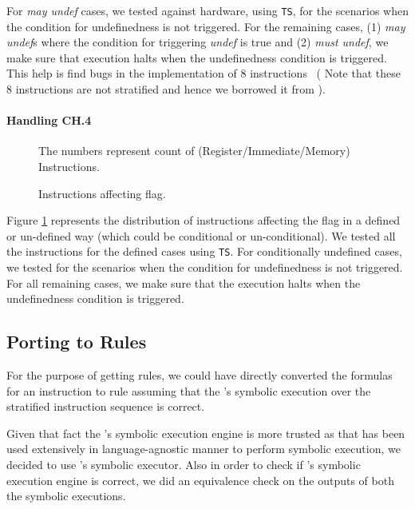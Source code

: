     For \emph{may undef} cases, we tested against hardware, using {\tt TS}, for
    the scenarios when the condition for undefinedness is not triggered.  For
    the remaining cases, (1) \emph{may undef}s where the condition for
    triggering \emph{undef} is true and (2) \emph{must undef}, we make sure that
    \K execution halts when the undefinedness condition is triggered. This help
    is find bugs in the \Stoke implementation of $8$
    instructions~\cite{BugStoke986} ( Note that these $8$ instructions are not
        stratified and hence we borrowed it from \Stoke).   
    
    
   \paragraph{Handling CH.4}
   \begin{figure}[t]
       \centering
       \caption{Instructions affecting  flag.} The numbers represent count of (Register/Immediate/Memory) Instructions. 
       \label{fig:AD}
   \end{figure}

   Figure \ref{fig:AD} represents the distribution of instructions affecting the
    flag in a defined or un-defined way (which could be conditional or
       un-conditional).  We tested all the instructions for the defined cases
   using {\tt TS}. For conditionally undefined cases, we tested for the
   scenarios when the condition for undefinedness is not triggered.  For all
   remaining cases,  we make sure that the \K execution halts when the
   undefinedness condition is triggered.        
   
   
   
\subsection{Porting to \K Rules}

For the purpose of getting  \K rules, we could have directly converted the
\Strata formulas for an instruction to \K rule assuming that the \Strata's
symbolic execution over the stratified instruction sequence is correct.

Given that fact the \K's symbolic execution engine is more trusted as that has
been used extensively in language-agnostic manner to perform symbolic execution,
     we decided to use \K's symbolic executor. Also in order to check if
     \Strata's symbolic execution engine is correct, we did an equivalence check
     on the outputs of both the symbolic executions.   
 

